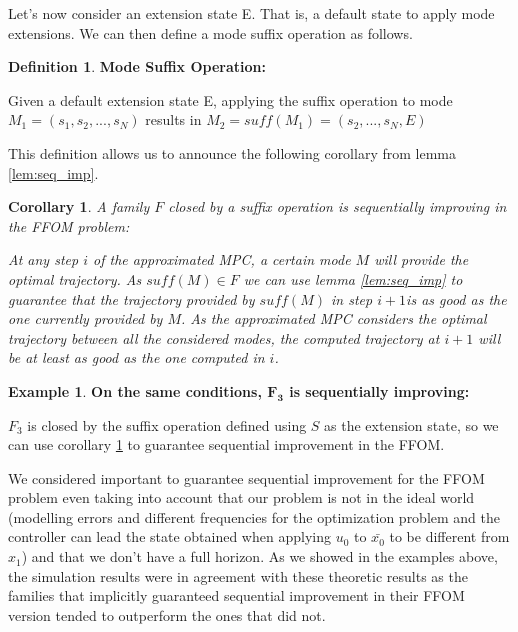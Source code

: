 \documentclass[12,twoside]{TFG-GM}
\newtheorem{corollary}[theorem]{Corollary}
\theoremstyle{definition}
\newtheorem{definition}[theorem]{Definition}
\newtheorem{example}[theorem]{Example}
\theoremstyle{remark}
\newcommand*\diff[1]{\bar{#1}}
\begin{document}
Let's now consider an extension state E. That is, a default state to apply mode extensions. We can then define a mode suffix operation as follows.

\begin{definition} {\textbf{Mode Suffix Operation:}}

Given a default extension state E, applying the suffix operation to mode $M_1 = (s_1, s_2, ..., s_N)$ results in $M_2 = suff(M_1) = (s_2, ..., s_N, E)$
\end{definition}

This definition allows us to announce the following corollary from lemma \ref{lem:seq_imp}.

\begin{corollary} \label{cor:seq_imp} {A family $F$ closed by a suffix operation is sequentially improving in the FFOM problem:}

At any step $i$ of the approximated MPC, a certain mode $M$ will provide the optimal trajectory. As $suff(M) \in F$ we can use lemma \ref{lem:seq_imp} to guarantee that the trajectory provided by $suff(M)$ in step $i + 1$is as good as the one currently provided by $M$. As the approximated MPC considers the optimal trajectory between all the considered modes, the computed trajectory at $i + 1$ will be at least as good as the one computed in $i$.
\end{corollary}

\begin{example} \textbf{On the same conditions, $\boldsymbol{F_3}$ is sequentially improving:}

$F_3$ is closed by the suffix operation defined using $S$ as the extension state, so we can use corollary \ref{cor:seq_imp} to guarantee sequential improvement in the FFOM.
\end{example}

We considered important to guarantee sequential improvement for the FFOM problem even taking into account that our problem is not in the ideal world (modelling errors and different frequencies for the optimization problem and the controller can lead the state obtained when applying $u_0$ to $\diff{x_0}$ to be different from $x_1$) and that we don't have a full horizon. As we showed in the examples above, the simulation results were in agreement with these theoretic results as the families that implicitly guaranteed sequential improvement in their FFOM version tended to outperform the ones that did not.
\end{document}
